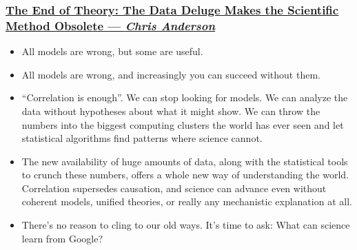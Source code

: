 \documentclass[UTF8,11pt,colorlinks,compress,openany]{beamer}%
\begin{document}
\begin{frame}\frametitle{\href{https://www.wired.com/2008/06/pb-theory/}{The End of Theory: The Data Deluge Makes the Scientific Method Obsolete \hfill --- \textsl{Chris Anderson}}}
\begin{itemize}
	\item All models are wrong, but some are useful.
	\item All models are wrong, and increasingly you can succeed without them.
	\item ``Correlation is enough''. We can stop looking for models. We can analyze the data without hypotheses about what it might show. We can throw the numbers into the biggest computing clusters the world has ever seen and let statistical algorithms find patterns where science cannot.
	\item The new availability of huge amounts of data, along with the statistical tools to crunch these numbers, offers a whole new way of understanding the world. Correlation supersedes causation, and science can advance even without coherent models, unified theories, or really any mechanistic explanation at all.
	\item There's no reason to cling to our old ways. It's time to ask: What can science learn from Google?
\end{itemize}
\end{frame}
\end{document}
